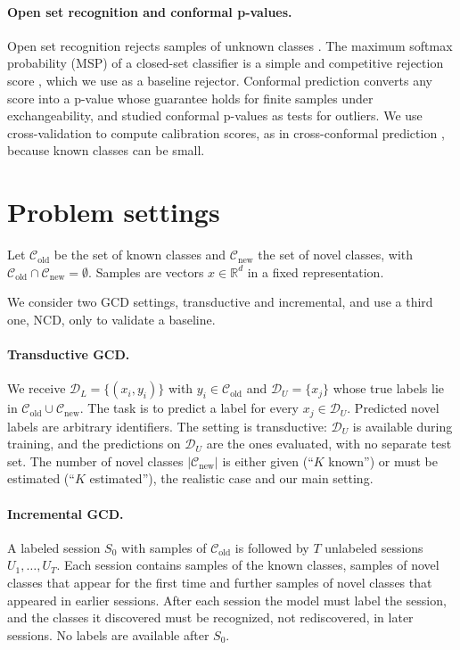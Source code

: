 \documentclass[pdflatex,sn-basic]{sn-jnl}
\newcommand{\DL}{\mathcal{D}_L}
\newcommand{\DU}{\mathcal{D}_U}
\newcommand{\Cold}{\mathcal{C}_{\mathrm{old}}}
\newcommand{\Cnew}{\mathcal{C}_{\mathrm{new}}}
\begin{document}
\paragraph{Open set recognition and conformal p-values.}
Open set recognition rejects samples of unknown classes \citep{scheirer2013osr}. The maximum softmax probability (MSP) of a closed-set classifier is a simple and competitive rejection score \citep{hendrycks2017msp}, which we use as a baseline rejector. Conformal prediction \citep{vovk2005alrw} converts any score into a p-value whose guarantee holds for finite samples under exchangeability, and \citet{bates2023conformal} studied conformal p-values as tests for outliers. We use cross-validation to compute calibration scores, as in cross-conformal prediction \citep{vovk2015crossconformal}, because known classes can be small.

\section{Problem settings}\label{sec:settings}

Let $\Cold$ be the set of known classes and $\Cnew$ the set of novel classes, with $\Cold \cap \Cnew = \emptyset$. Samples are vectors $x \in \mathbb{R}^d$ in a fixed representation.

We consider two GCD settings, transductive and incremental, and use a third one, NCD, only to validate a baseline.

\paragraph{Transductive GCD.} We receive $\DL = \{(x_i, y_i)\}$ with $y_i \in \Cold$ and $\DU = \{x_j\}$ whose true labels lie in $\Cold \cup \Cnew$. The task is to predict a label for every $x_j \in \DU$. Predicted novel labels are arbitrary identifiers. The setting is transductive: $\DU$ is available during training, and the predictions on $\DU$ are the ones evaluated, with no separate test set. The number of novel classes $|\Cnew|$ is either given (``$K$ known'') or must be estimated (``$K$ estimated''), the realistic case and our main setting.

\paragraph{Incremental GCD.} A labeled session $S_0$ with samples of $\Cold$ is followed by $T$ unlabeled sessions $U_1, \dots, U_T$. Each session contains samples of the known classes, samples of novel classes that appear for the first time and further samples of novel classes that appeared in earlier sessions. After each session the model must label the session, and the classes it discovered must be recognized, not rediscovered, in later sessions. No labels are available after $S_0$.
\end{document}
